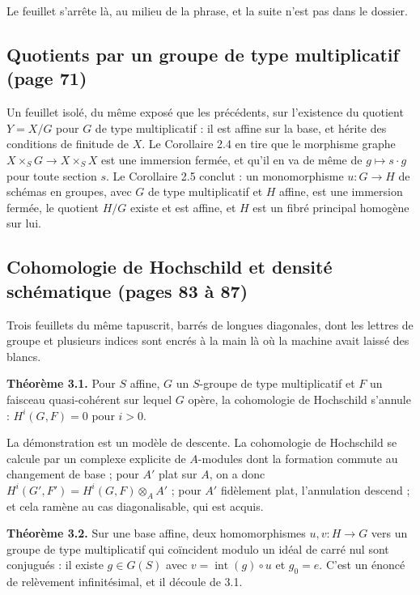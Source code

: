 \documentclass[11pt,a4paper]{article}
\begin{document}
Le feuillet s'arrête là, au milieu de la phrase, et la suite n'est pas dans le
dossier.

\subsection*{Quotients par un groupe de type multiplicatif (page 71)}

Un feuillet isolé, du même exposé que les précédents, sur l'existence du
quotient $Y = X/G$ pour $G$ de type multiplicatif : il est affine sur la base,
et hérite des conditions de finitude de $X$. Le Corollaire 2.4 en tire que le
morphisme graphe $X \times_S G \to X \times_S X$ est une immersion fermée, et
qu'il en va de même de $g \mapsto s \cdot g$ pour toute section $s$. Le
Corollaire 2.5 conclut : un monomorphisme $u : G \to H$ de schémas en groupes,
avec $G$ de type multiplicatif et $H$ affine, est une immersion fermée, le
quotient $H/G$ existe et est affine, et $H$ est un fibré principal homogène sur
lui.

\subsection*{Cohomologie de Hochschild et densité schématique (pages 83 à 87)}

Trois feuillets du même tapuscrit, barrés de longues diagonales, dont les
lettres de groupe et plusieurs indices sont encrés à la main là où la machine
avait laissé des blancs.

\textbf{Théorème 3.1.} Pour $S$ affine, $G$ un $S$-groupe de type multiplicatif
et $F$ un faisceau quasi-cohérent sur lequel $G$ opère, la cohomologie de
Hochschild s'annule : $H^i(G,F) = 0$ pour $i > 0$.

La démonstration est un modèle de descente. La cohomologie de Hochschild se
calcule par un complexe explicite de $A$-modules dont la formation commute au
changement de base ; pour $A'$ plat sur $A$, on a donc
$H^i(G',F') = H^i(G,F) \otimes_A A'$ ; pour $A'$ fidèlement plat, l'annulation
descend ; et cela ramène au cas diagonalisable, qui est acquis.

\textbf{Théorème 3.2.} Sur une base affine, deux homomorphismes $u, v : H \to G$
vers un groupe de type multiplicatif qui coïncident modulo un idéal de carré nul
sont conjugués : il existe $g \in G(S)$ avec $v = \operatorname{int}(g) \circ u$
et $g_0 = e$. C'est un énoncé de relèvement infinitésimal, et il découle de 3.1.
\end{document}
